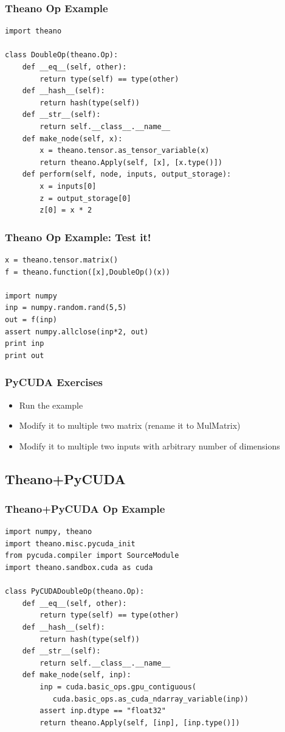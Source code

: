 \documentclass[a4paper,9pt]{beamer}
\begin{document}
\begin{frame}[fragile]
\frametitle{Theano Op Example}
\begin{Verbatim}
import theano

class DoubleOp(theano.Op):
    def __eq__(self, other):
        return type(self) == type(other)
    def __hash__(self):
        return hash(type(self))
    def __str__(self):
        return self.__class__.__name__
    def make_node(self, x):
        x = theano.tensor.as_tensor_variable(x)
        return theano.Apply(self, [x], [x.type()])
    def perform(self, node, inputs, output_storage):
        x = inputs[0]
        z = output_storage[0]
        z[0] = x * 2

\end{Verbatim}
\end{frame}

\begin{frame}[fragile]
\frametitle{Theano Op Example: Test it!}
\begin{Verbatim}
x = theano.tensor.matrix()
f = theano.function([x],DoubleOp()(x))

import numpy
inp = numpy.random.rand(5,5)
out = f(inp)
assert numpy.allclose(inp*2, out)
print inp
print out
\end{Verbatim}
\end{frame}

\begin{frame}
\frametitle{PyCUDA Exercises}
\begin{itemize}
\item Run the example
\item Modify it to multiple two matrix (rename it to MulMatrix)
\item Modify it to multiple two inputs with arbitrary number of dimensions
\end{itemize}
\end{frame}

\subsection{Theano+PyCUDA}
\begin{frame}[fragile]
\frametitle{Theano+PyCUDA Op Example}
\begin{Verbatim}
import numpy, theano
import theano.misc.pycuda_init
from pycuda.compiler import SourceModule
import theano.sandbox.cuda as cuda

class PyCUDADoubleOp(theano.Op):
    def __eq__(self, other):
        return type(self) == type(other)
    def __hash__(self):
        return hash(type(self))
    def __str__(self):
        return self.__class__.__name__
    def make_node(self, inp):
        inp = cuda.basic_ops.gpu_contiguous(
           cuda.basic_ops.as_cuda_ndarray_variable(inp))
        assert inp.dtype == "float32"
        return theano.Apply(self, [inp], [inp.type()])
\end{Verbatim}
\end{frame}
\end{document}
